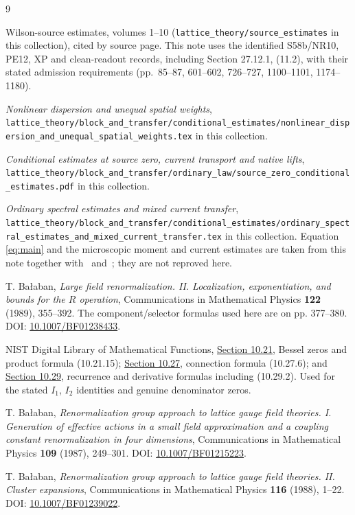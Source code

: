 \documentclass[11pt,letterpaper]{article}
\theoremstyle{remark}\newtheorem{remark}[theorem]{Remark}
\begin{document}
\clearpage
\begin{thebibliography}{9}

Wilson-source estimates, volumes 1--10 (\texttt{lattice\_theory/source\_estimates} in this collection), cited by source page. This note uses the identified S58b/NR10, PE12, XP and clean-readout records, including Section 27.12.1, (11.2), with their stated admission requirements (pp.~85--87, 601--602, 726--727, 1100--1101, 1174--1180).

\emph{Nonlinear dispersion and unequal spatial weights}, \texttt{lattice\_theory/block\_and\_transfer/conditional\_estimates/nonlinear\_dispersion\_and\_unequal\_spatial\_weights.tex} in this collection.

\emph{Conditional estimates at source zero, current transport and native lifts}, \texttt{lattice\_theory/block\_and\_transfer/ordinary\_law/source\_zero\_conditional\_estimates.pdf} in this collection.

\emph{Ordinary spectral estimates and mixed current transfer}, \texttt{lattice\_theory/block\_and\_transfer/conditional\_estimates/ordinary\_spectral\_estimates\_and\_mixed\_current\_transfer.tex} in this collection. Equation \eqref{eq:main} and the microscopic moment and current estimates are taken from this note together with~\cite{ND} and~\cite{SZ}; they are not reproved here.

T. Ba\l aban, \emph{Large field renormalization. II. Localization, exponentiation, and bounds for the \(R\) operation}, Communications in Mathematical Physics \textbf{122} (1989), 355--392. The component/selector formulas used here are on pp. 377--380. DOI: \href{https://doi.org/10.1007/BF01238433}{10.1007/BF01238433}.

NIST Digital Library of Mathematical Functions, \href{https://dlmf.nist.gov/10.21}{Section 10.21}, Bessel zeros and product formula (10.21.15); \href{https://dlmf.nist.gov/10.27}{Section 10.27}, connection formula (10.27.6); and \href{https://dlmf.nist.gov/10.29}{Section 10.29}, recurrence and derivative formulas including (10.29.2). Used for the stated \(I_1\), \(I_2\) identities and genuine denominator zeros.

T. Ba\l aban, \emph{Renormalization group approach to lattice gauge field theories. I. Generation of effective actions in a small field approximation and a coupling constant renormalization in four dimensions}, Communications in Mathematical Physics \textbf{109} (1987), 249--301.
DOI: \href{https://doi.org/10.1007/BF01215223}{10.1007/BF01215223}.

T. Ba\l aban, \emph{Renormalization group approach to lattice gauge field theories. II. Cluster expansions}, Communications in Mathematical Physics \textbf{116} (1988), 1--22.
DOI: \href{https://doi.org/10.1007/BF01239022}{10.1007/BF01239022}.

\end{thebibliography}
\end{document}
